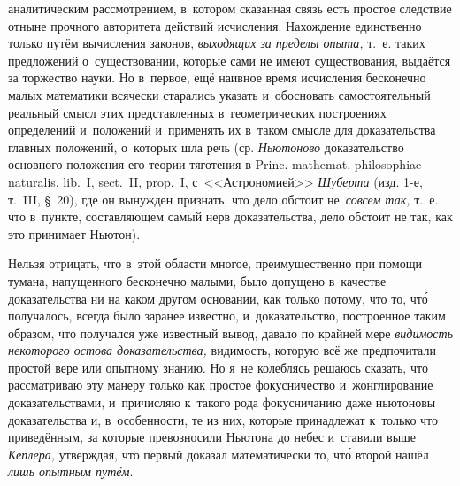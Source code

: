 аналитическим рассмотрением, в~котором сказанная связь есть простое следствие
отныне прочного авторитета действий исчисления. Нахождение единственно только
путём вычисления законов, {\em выходящих за пределы опыта,} т.~е. таких
предложений о~существовании, которые сами не имеют существования, выдаётся за
торжество науки. Но в~первое, ещё наивное время исчисления бесконечно малых
математики всячески старались указать и~обосновать самостоятельный реальный
смысл этих представленных в~геометрических построениях определений и~положений
и~применять их в~таком смысле для доказательства главных положений, о~которых
шла речь (ср. {\em Ньютоново} доказательство основного положения его теории
тяготения в Princ. mathemat. philoso\-phiae naturalis, lib.~I, sect.~II,
prop.~I, с~<<Астрономией>> {\em Шуберта} (изд. 1-е, т.~III, \S~20), где он
вынужден признать, что дело обстоит не~{\em совсем так,} т.~е. что в~пункте,
составляющем самый нерв доказательства, дело обстоит не так,
как это принимает Ньютон).

Нельзя отрицать, что в~этой области многое, преимущественно при помощи тумана,
напущенного бесконечно малыми, было допущено в~качестве доказательства ни на
каком другом основании, как только потому, что то, чт\'{о} получалось, всегда было
заранее известно, и~доказательство, построенное таким образом, что получался
уже известный вывод, давало по крайней мере {\em видимость некоторого остова
доказательства,} видимость, которую всё же предпочитали простой вере или
опытному знанию. Но я~не колеблясь решаюсь сказать, что рассматриваю эту манеру
только как простое фокусничество и~жонглирование доказательствами, и~причисляю
к~такого рода фокусничанию даже ньютоновы доказательства и, в~особенности, те
из них, которые принадлежат к~только что приведённым, за которые превозносили
Ньютона до небес и~ставили выше {\em Кеплера,} утверждая, что первый доказал
математически то, чт\'{о} второй нашёл {\em лишь опытным путём}.

